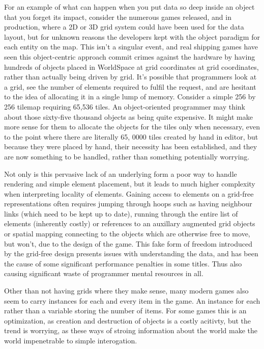 \documentclass[a4paper,12pt]{article}
\begin{document}
For an example of what can happen when you put data so deep inside an object that you forget its impact, consider the numerous games released, and in production, where a 2D or 3D grid system could have been used for the data layout, but for unknown reasons the developers kept with the object paradigm for each entity on the map.
This isn't a singular event, and real shipping games have seen this object-centric approach commit crimes against the hardware by having hundreds of objects placed in WorldSpace at grid coordinates at grid coordinates, rather than actually being driven by grid.
It's possible that programmers look at a grid, see the number of elements required to fulfil the request, and are hesitant to the idea of allocating it in a single lump of memory.
Consider a simple 256 by 256 tilemap requiring 65,536 tiles.
An object-oriented programmer may think about those sixty-five thousand objects as being quite expensive.
It might make more sense for them to allocate the objects for the tiles only when necessary, even to the point where there are literally 65, 0000 tiles created by hand in editor, but because they were placed by hand, their necessity has been established, and they are now something to be handled, rather than something potentially worrying.

Not only is this pervasive lack of an underlying form a poor way to handle rendering and simple element placement, but it leads to much higher complexity when interpreting locality of elements.
Gaining access to elements on a grid-free representations often requires jumping through hoops such as having neighbour links (which need to be kept up to date), running through the entire list of elements (inherently costly) or references to an auxillary augmented grid objects or spatial mapping connecting to the objects which are otherwise free to move, but won't, due to the design of the game.
This fake form of freedom introduced by the grid-free design presents issues with understanding the data, and has been the cause of some significant performance penalties in some titles.
Thus also causing significant waste of programmer mental resources in all.

Other than not having  grids where they make sense, many modern games also seem to carry instances for each and every item in the game.
An instance for each rather than a variable storing the number of items.
For some games this is an optimization, as creation and destruction of objects is a costly acitivty, but the trend is worrying, as these ways of stroing information about the world make the world impenetrable to simple interogation.
\end{document}
